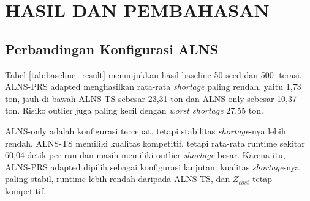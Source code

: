 \documentclass[journal]{IEEEtran}
\theoremstyle{definition}
\theoremstyle{definition}
\theoremstyle{plain}
\begin{document}
    \section{HASIL DAN PEMBAHASAN}
    \subsection{Perbandingan Konfigurasi ALNS}
    Tabel \ref{tab:baseline_result} menunjukkan hasil baseline 50 seed dan 500 iterasi. ALNS-PRS adapted menghasilkan rata-rata \textit{shortage} paling rendah, yaitu 1,73 ton, jauh di bawah ALNS-TS sebesar 23,31 ton dan ALNS-only sebesar 10,37 ton. Risiko outlier juga paling kecil dengan \textit{worst shortage} 27,55 ton.

    \begin{table}[H]
    \centering
    \caption{Ringkasan eksperimen baseline multi-seed}
    \label{tab:baseline_result}
    \end{table}

    ALNS-only adalah konfigurasi tercepat, tetapi stabilitas \textit{shortage}-nya lebih rendah. ALNS-TS memiliki kualitas kompetitif, tetapi rata-rata runtime sekitar 60,04 detik per run dan masih memiliki outlier \textit{shortage} besar. Karena itu, ALNS-PRS adapted dipilih sebagai konfigurasi lanjutan: kualitas \textit{shortage}-nya paling stabil, runtime lebih rendah daripada ALNS-TS, dan $Z_{cost}$ tetap kompetitif.
\end{document}
